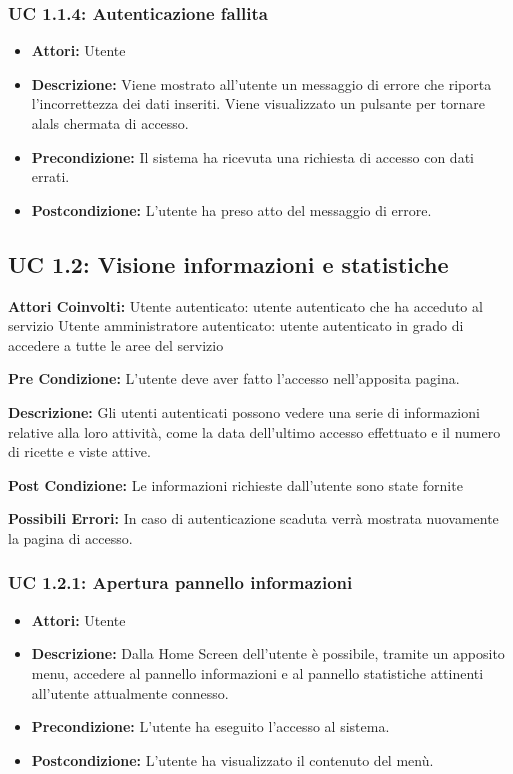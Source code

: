 \subsubsection{UC 1.1.4: Autenticazione fallita}

\begin{itemize}
\item \textbf{Attori:} Utente
\item \textbf{Descrizione:} Viene mostrato all'utente un messaggio di errore che riporta l'incorrettezza dei dati inseriti. Viene visualizzato un pulsante per tornare alals chermata di accesso.
\item \textbf{Precondizione:} Il sistema ha ricevuta una richiesta di accesso con dati errati.
\item \textbf{Postcondizione:} L'utente ha preso atto del messaggio di errore.
\end{itemize}

\subsection{UC 1.2: Visione informazioni e statistiche}

\textbf{Attori Coinvolti:}
Utente autenticato: utente autenticato che ha acceduto al servizio
Utente amministratore autenticato: utente autenticato in grado di accedere a tutte le aree del servizio

\textbf{Pre Condizione:}
L'utente deve aver fatto l'accesso nell'apposita pagina.

\textbf{Descrizione:}
Gli utenti autenticati possono vedere una serie di informazioni relative alla loro attività, come la data dell’ultimo accesso effettuato e il numero di ricette e viste attive.

\textbf{Post Condizione:}
Le informazioni richieste dall'utente sono state fornite

\textbf{Possibili Errori:}
In caso di autenticazione scaduta verrà mostrata nuovamente la pagina di accesso.

\subsubsection{UC 1.2.1: Apertura pannello informazioni}

\begin{itemize}
\item \textbf{Attori:} Utente
\item \textbf{Descrizione:} Dalla Home Screen dell'utente è possibile, tramite un apposito menu, accedere al pannello informazioni e al pannello statistiche attinenti all'utente attualmente connesso.
\item \textbf{Precondizione:} L'utente ha eseguito l'accesso al sistema.
\item \textbf{Postcondizione:} L'utente ha visualizzato il contenuto del menù.
\end{itemize}

